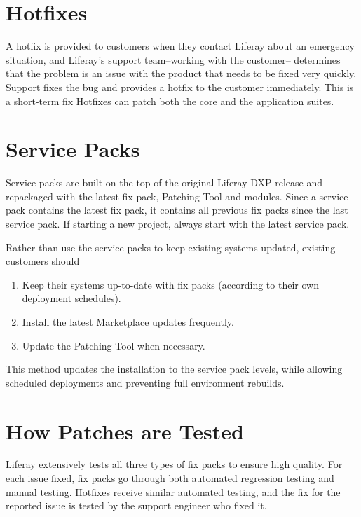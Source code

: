 \section{Hotfixes}\label{hotfixes}

A hotfix is provided to customers when they contact Liferay about an
emergency situation, and Liferay's support team--working with the
customer-- determines that the problem is an issue with the product that
needs to be fixed very quickly. Support fixes the bug and provides a
hotfix to the customer immediately. This is a short-term fix Hotfixes
can patch both the core and the application suites.

\section{Service Packs}\label{service-packs}

Service packs are built on the top of the original Liferay DXP release
and repackaged with the latest fix pack, Patching Tool and modules.
Since a service pack contains the latest fix pack, it contains all
previous fix packs since the last service pack. If starting a new
project, always start with the latest service pack.

Rather than use the service packs to keep existing systems updated,
existing customers should

\begin{enumerate}
\def\labelenumi{\arabic{enumi}.}
\item
  Keep their systems up-to-date with fix packs (according to their own
  deployment schedules).
\item
  Install the latest Marketplace updates frequently.
\item
  Update the Patching Tool when necessary.
\end{enumerate}

This method updates the installation to the service pack levels, while
allowing scheduled deployments and preventing full environment rebuilds.

\section{How Patches are Tested}\label{how-patches-are-tested}

Liferay extensively tests all three types of fix packs to ensure high
quality. For each issue fixed, fix packs go through both automated
regression testing and manual testing. Hotfixes receive similar
automated testing, and the fix for the reported issue is tested by the
support engineer who fixed it.

